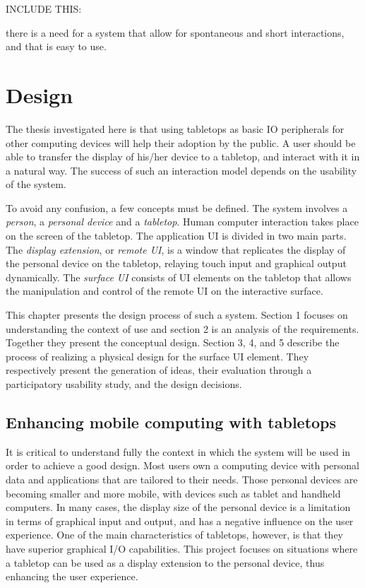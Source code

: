 INCLUDE THIS:

there is a need for a system that allow for spontaneous and short interactions, and that is easy to use.


\chapter{Design}
\label{design}

The thesis investigated here is that using tabletops as basic IO peripherals for other computing devices will help their adoption by the public.
A user should be able to transfer the display of his/her device to a tabletop, and interact with it in a natural way.
The success of such an interaction model depends on the usability of the system. 

To avoid any confusion, a few concepts must be defined.
The system involves a \emph{person}, a \emph{personal device} and a \emph{tabletop}.
Human computer interaction takes place on the screen of the tabletop.
The application UI is divided in two main parts.
The \emph{display extension}, or \emph{remote UI}, is a window that replicates the display of the personal device on the tabletop, relaying touch input and graphical output dynamically.
The \emph{surface UI} consists of UI elements on the tabletop that allows the manipulation and control of the remote UI on the interactive surface.

This chapter presents the design process of such a system.
Section 1 focuses on understanding the context of use and section 2 is an analysis of the requirements. Together they present the conceptual design.
Section 3, 4, and 5 describe the process of realizing a physical design for the surface UI element. They respectively present the generation of ideas, their evaluation through a participatory usability study, and the design decisions.

\section{Enhancing mobile computing with tabletops}

It is critical to understand fully the context in which the system will be used in order to achieve a good design.
Most users own a computing device with personal data and applications that are tailored to their needs.
Those personal devices are becoming smaller and more mobile, with devices such as tablet and handheld computers.
In many cases, the display size of the personal device is a limitation in terms of graphical input and output, and has a negative influence on the user experience.
One of the main characteristics of tabletops, however, is that they have superior graphical I/O capabilities.
This project focuses on situations where a tabletop can be used as a display extension to the personal device, thus enhancing the user experience.

